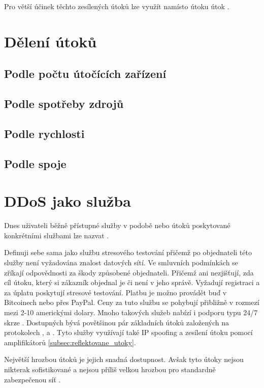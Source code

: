 Pro větší účinek těchto zesílených útoků lze využít namísto  útoku útok .

\section{Dělení útoků}
\subsection{Podle počtu útočících zařízení}

\subsection{Podle spotřeby zdrojů}

\subsection{Podle rychlosti}

\subsection{Podle spoje}

\section{DDoS jako služba}
Dnes uživateli běžně přístupné služby v podobě  nebo  útoků poskytované
konkrétními službami lze nazvat .

Definuji sebe sama jako službu stresového testování přičemž po objednateli této služby není
vyžadována znalost datových sítí. Ve smluvních podmínkách se zříkají odpovědnosti za škody
způsobené objednateli. Přičemž ani nezjišťují, zda cíl útoku, který si zákazník objednal je či
není v jeho správě. Vyžadují registraci a za úplatu poskytují stresové testování. Platbu je
možno provádět buď v Bitcoinech nebo přes PayPal. Ceny za tuto službu se pohybují přibližně v
rozmezí mezi 2-10 americkými dolary. Mnoho takových služeb nabízí i podporu typu 24/7 skrze
. Dostupných bývá povětšinou pár základních útoků založených na protokolech
,  a . Tyto služby využívají také IP spoofing
a zesílení útoku pomocí amplifikátorů \ref{subsec:reflektovane_utoky}. 

Největší hrozbou  útoků je jejich snadná dostupnost. Avšak tyto útoky nejsou
nikterak sofistikované a nejsou příliš velkou hrozbou pro standardně zabezpečenou síť
\cite{DDoSaaS}.

